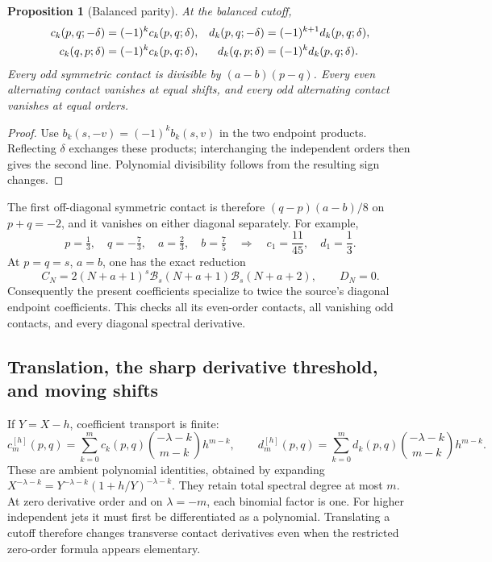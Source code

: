 \documentclass[11pt,letterpaper]{article}
\numberwithin{equation}{section}
\newtheorem{proposition}[theorem]{Proposition}
\theoremstyle{definition}
\theoremstyle{remark}
\begin{document}
\begin{proposition}[Balanced parity]\label{ct:parity}
At the balanced cutoff,
\begin{align}
 c_k(p,q;-\delta)&=(-1)^kc_k(p,q;\delta),&
 d_k(p,q;-\delta)&=(-1)^{k+1}d_k(p,q;\delta),\label{ct:reflection}\\
 c_k(q,p;\delta)&=(-1)^kc_k(p,q;\delta),&
 d_k(q,p;\delta)&=(-1)^kd_k(p,q;\delta).\notag
\end{align}
Every odd symmetric contact is divisible by $(a-b)(p-q)$.
Every even alternating contact vanishes at equal shifts, and every odd
alternating contact vanishes at equal orders.
\end{proposition}
\begin{proof}
Use $b_k(s,-v)=(-1)^kb_k(s,v)$ in the two endpoint products. Reflecting
$\delta$ exchanges these products; interchanging the independent orders
then gives the second line. Polynomial divisibility follows from the
resulting sign changes.
\end{proof}

The first off-diagonal symmetric contact is therefore
$(q-p)(a-b)/8$ on $p+q=-2$, and it vanishes on either diagonal separately.
For example,
\[
 p=\tfrac13,\quad q=-\tfrac73,\quad a=\tfrac23,\quad b=\tfrac75
 \quad\Longrightarrow\quad c_1=\frac{11}{45},\quad d_1=\frac13.
\]
At $p=q=s$, $a=b$, one has the exact reduction
\[
 C_N=2(N+a+1)^s\mathcal B_s(N+a+1)\mathcal B_s(N+a+2),
 \qquad D_N=0.
\]
Consequently the present coefficients specialize to twice the source's
diagonal endpoint coefficients. This checks all its even-order contacts,
all vanishing odd contacts, and every diagonal spectral derivative.

\subsection{Translation, the sharp derivative threshold, and moving shifts}

If $Y=X-h$, coefficient transport is finite:
\begin{equation}\label{ct:translate}
 c_m^{[h]}(p,q)=\sum_{k=0}^m c_k(p,q)
      \binom{-\lambda-k}{m-k}h^{m-k},
 \qquad
 d_m^{[h]}(p,q)=\sum_{k=0}^m d_k(p,q)
      \binom{-\lambda-k}{m-k}h^{m-k}.
\end{equation}
These are ambient polynomial identities, obtained by expanding
$X^{-\lambda-k}=Y^{-\lambda-k}(1+h/Y)^{-\lambda-k}$.
They retain total spectral degree at most $m$. At zero derivative order
and on $\lambda=-m$, each binomial factor is one. For higher independent
jets it must first be differentiated as a polynomial. Translating a cutoff
therefore changes transverse contact derivatives even when the restricted
zero-order formula appears elementary.
\end{document}
